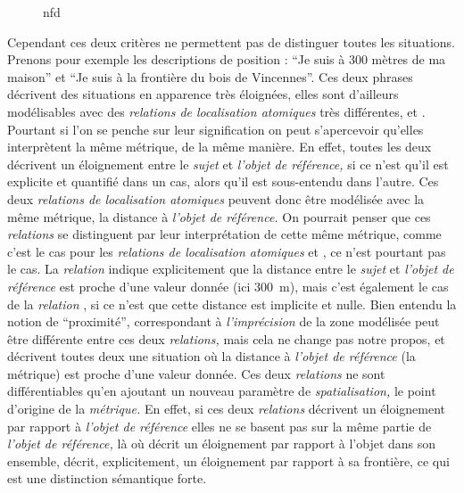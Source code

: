 \begin{figure}
  \centering
  
  \caption{nfd}
  \label{fig:Exemple_Metrique_vs_Selecteur}
\end{figure}

Cependant ces deux critères ne permettent pas de distinguer toutes les situations. Prenons pour exemple les descriptions de position : \enquote{Je suis à 300 mètres de ma maison} et \enquote{Je suis à la frontière du bois de Vincennes}. Ces deux phrases décrivent des situations en apparence très éloignées, elles sont d'ailleurs modélisables avec des \emph{relations de localisation atomiques} très différentes,  et . Pourtant si l'on se penche sur leur signification on peut s’apercevoir qu'elles interprètent la même métrique, de la même manière. En effet, toutes les deux décrivent un éloignement entre le \emph{sujet} et \emph{l'objet de référence,} si ce n'est qu'il est explicite et quantifié dans un cas, alors qu'il est sous-entendu dans l'autre. Ces deux \emph{relations de localisation atomiques} peuvent donc être modélisée avec la même métrique, la distance à \emph{l'objet de référence.} On pourrait penser que ces \emph{relations} se distinguent par leur interprétation de cette même métrique, comme c'est le cas pour les \emph{relations de localisation atomiques}  et , ce n'est pourtant pas le cas. La \emph{relation}  indique explicitement que la distance entre le \emph{sujet} et \emph{l'objet de référence} est proche d'une valeur donnée (ici \SI{300}{\meter}), mais c'est également le cas de la \emph{relation} , si ce n'est que cette distance est implicite et nulle. Bien entendu la notion de \enquote{proximité}, correspondant à \emph{l'imprécision} de la zone modélisée peut être différente entre ces deux \emph{relations,} mais cela ne change pas notre propos,  et  décrivent toutes deux une situation où la distance à \emph{l'objet de référence} (\ie la métrique) est proche d'une valeur donnée. Ces deux \emph{relations} ne sont différentiables qu'en ajoutant un nouveau paramètre de \emph{spatialisation,} le point d'origine de la \emph{métrique.} En effet, si ces deux \emph{relations} décrivent un éloignement par rapport à \emph{l'objet de référence} elles ne se basent pas sur la même partie de \emph{l'objet de référence,} là où  décrit un éloignement par rapport à l'objet dans son ensemble,  décrit, explicitement, un éloignement par rapport à sa frontière, ce qui est une distinction sémantique forte.

